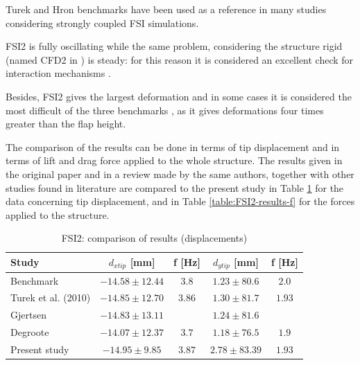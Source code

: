 Turek and Hron benchmarks have been used as a reference in many studies considering strongly coupled FSI simulations. 

FSI2 is fully oscillating while the same problem, considering the structure rigid (named CFD2 in \cite{turek2006proposal}) is steady: for this reason it is considered an excellent check for interaction mechanisms \cite{turek2010numerical}.

Besides, FSI2 gives the largest deformation and in some cases it is considered the most difficult of the three benchmarks \cite{richter2015time}, as it gives deformations four times greater than the flap height.

The comparison of the results can be done in terms of tip displacement and in terms of lift and drag force applied to the whole structure. The results given in the original paper and in a review made by the same authors, together with other studies found in literature are compared to the present study in Table \ref{table:FSI2-results-d} for the data concerning tip displacement, and in Table \ref{table:FSI2-results-f} for the forces applied to the structure.


\begin{table}[!htb]
	\begin{center}
		\begin{tabular}{ l | c c | c c  |  } 
			Study & $d_{x tip}$ [\si{mm}] & f [\si{Hz}] & $d_{y tip}$ [\si{mm}] & f [\si{Hz}] \\ 
			\hline
			\hline
			Benchmark  \cite{turek2006proposal} & $-14.58\pm12.44$ & $3.8$ & $1.23\pm80.6$ & $2.0$     \\
			Turek et al. (2010) \cite{turek2010numerical} & $-14.85\pm12.70$ & $3.86$ & $1.30\pm81.7$ & $1.93$ \\
			Gjertsen \cite{gjertsen2017development} & $-14.83\pm13.11$ & & $1.24\pm81.6$ & \\
			Degroote \cite{degroote2009interface}  & $-14.07\pm12.37$ & $3.7$ & $1.18\pm76.5$ & $1.9$ \\
			\hline
			Present study & $-14.95\pm9.85$ & $3.87$ & $2.78\pm83.39$ & $1.93$ \\ 
		\end{tabular}
	\end{center}
	\caption{FSI2: comparison of results (displacements)}
	\label{table:FSI2-results-d}
\end{table}

